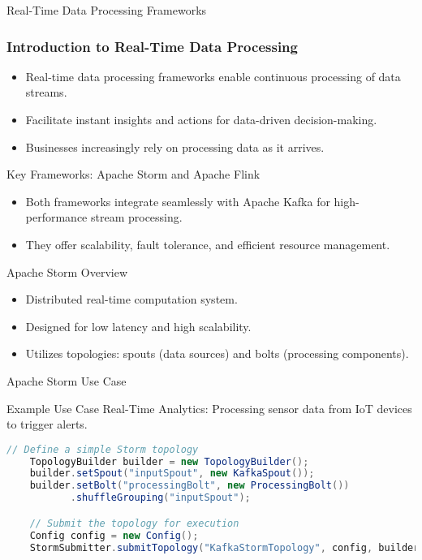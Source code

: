 \documentclass[aspectratio=169]{beamer}
\begin{document}
\begin{frame}{Real-Time Data Processing Frameworks}
    \frametitle{Introduction to Real-Time Data Processing}
    \begin{itemize}
        \item Real-time data processing frameworks enable continuous processing of data streams.
        \item Facilitate instant insights and actions for data-driven decision-making.
        \item Businesses increasingly rely on processing data as it arrives.
    \end{itemize}
\end{frame}

\begin{frame}{Key Frameworks: Apache Storm and Apache Flink}
    \begin{itemize}
        \item Both frameworks integrate seamlessly with Apache Kafka for high-performance stream processing.
        \item They offer scalability, fault tolerance, and efficient resource management.
    \end{itemize}
\end{frame}

\begin{frame}{Apache Storm Overview}
    \begin{itemize}
        \item Distributed real-time computation system.
        \item Designed for low latency and high scalability.
        \item Utilizes topologies: spouts (data sources) and bolts (processing components).
    \end{itemize}
\end{frame}

\begin{frame}{Apache Storm Use Case}
    \begin{block}{Example Use Case}
        Real-Time Analytics: Processing sensor data from IoT devices to trigger alerts.
    \end{block}
    
    \begin{lstlisting}[language=Java]
    // Define a simple Storm topology
    TopologyBuilder builder = new TopologyBuilder();
    builder.setSpout("inputSpout", new KafkaSpout());
    builder.setBolt("processingBolt", new ProcessingBolt())
           .shuffleGrouping("inputSpout");

    // Submit the topology for execution
    Config config = new Config();
    StormSubmitter.submitTopology("KafkaStormTopology", config, builder.createTopology());
    \end{lstlisting}
\end{frame}
\end{document}
